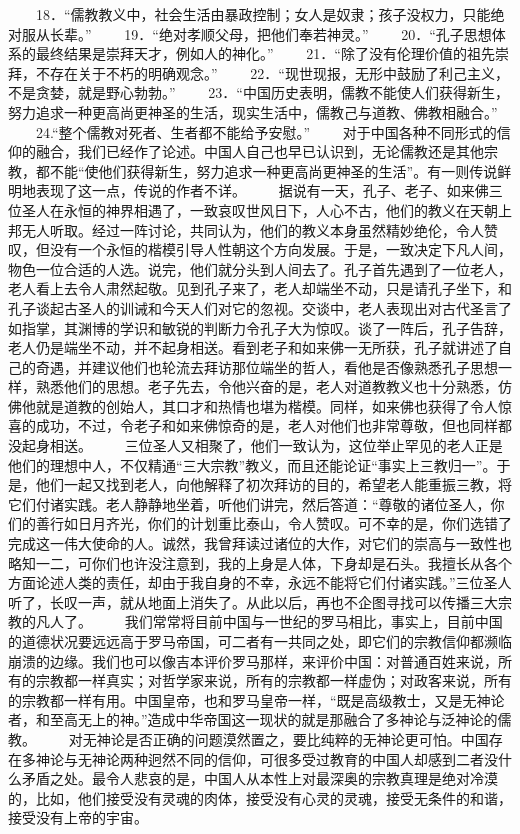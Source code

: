 \documentclass[12pt,oneside]{book}
\begin{document}
\begin{common-format}
　　18．“儒教教义中，社会生活由暴政控制；女人是奴隶；孩子没权力，只能绝对服从长辈。” 
　　19．“绝对孝顺父母，把他们奉若神灵。” 
　　20．“孔子思想体系的最终结果是崇拜天才，例如人的神化。” 
　　21．“除了没有伦理价值的祖先崇拜，不存在关于不朽的明确观念。” 
　　22．“现世现报，无形中鼓励了利己主义，不是贪婪，就是野心勃勃。” 
　　23．“中国历史表明，儒教不能使人们获得新生，努力追求一种更高尚更神圣的生活，现实生活中，儒教己与道教、佛教相融合。” 
　　24.“整个儒教对死者、生者都不能给予安慰。” 
　　对于中国各种不同形式的信仰的融合，我们已经作了论述。中国人自己也早已认识到，无论儒教还是其他宗教，都不能“使他们获得新生，努力追求一种更高尚更神圣的生活”。有一则传说鲜明地表现了这一点，传说的作者不详。 
　　据说有一天，孔子、老子、如来佛三位圣人在永恒的神界相遇了，一致哀叹世风日下，人心不古，他们的教义在天朝上邦无人听取。经过一阵讨论，共同认为，他们的教义本身虽然精妙绝伦，令人赞叹，但没有一个永恒的楷模引导人性朝这个方向发展。于是，一致决定下凡人间，物色一位合适的人选。说完，他们就分头到人间去了。孔子首先遇到了一位老人，老人看上去令人肃然起敬。见到孔子来了，老人却端坐不动，只是请孔子坐下，和孔子谈起古圣人的训诫和今天人们对它的忽视。交谈中，老人表现出对古代圣言了如指掌，其渊博的学识和敏锐的判断力令孔子大为惊叹。谈了一阵后，孔子告辞，老人仍是端坐不动，并不起身相送。看到老子和如来佛一无所获，孔子就讲述了自己的奇遇，并建议他们也轮流去拜访那位端坐的哲人，看他是否像熟悉孔子思想一样，熟悉他们的思想。老子先去，令他兴奋的是，老人对道教教义也十分熟悉，仿佛他就是道教的创始人，其口才和热情也堪为楷模。同样，如来佛也获得了令人惊喜的成功，不过，令老子和如来佛惊奇的是，老人对他们也非常尊敬，但也同样都没起身相送。 
　　三位圣人又相聚了，他们一致认为，这位举止罕见的老人正是他们的理想中人，不仅精通“三大宗教”教义，而且还能论证“事实上三教归一”。于是，他们一起又找到老人，向他解释了初次拜访的目的，希望老人能重振三教，将它们付诸实践。老人静静地坐着，听他们讲完，然后答道：“尊敬的诸位圣人，你们的善行如日月齐光，你们的计划重比泰山，令人赞叹。可不幸的是，你们选错了完成这一伟大使命的人。诚然，我曾拜读过诸位的大作，对它们的崇高与一致性也略知一二，可你们也许没注意到，我的上身是人体，下身却是石头。我擅长从各个方面论述人类的责任，却由于我自身的不幸，永远不能将它们付诸实践。”三位圣人听了，长叹一声，就从地面上消失了。从此以后，再也不企图寻找可以传播三大宗教的凡人了。 
　　我们常常将目前中国与一世纪的罗马相比，事实上，目前中国的道德状况要远远高于罗马帝国，可二者有一共同之处，即它们的宗教信仰都濒临崩溃的边缘。我们也可以像吉本评价罗马那样，来评价中国：对普通百姓来说，所有的宗教都一样真实；对哲学家来说，所有的宗教都一样虚伪；对政客来说，所有的宗教都一样有用。中国皇帝，也和罗马皇帝一样，“既是高级教士，又是无神论者，和至高无上的神。”造成中华帝国这一现状的就是那融合了多神论与泛神论的儒教。 
　　对无神论是否正确的问题漠然置之，要比纯粹的无神论更可怕。中国存在多神论与无神论两种迥然不同的信仰，可很多受过教育的中国人却感到二者没什么矛盾之处。最令人悲哀的是，中国人从本性上对最深奥的宗教真理是绝对冷漠的，比如，他们接受没有灵魂的肉体，接受没有心灵的灵魂，接受无条件的和谐，接受没有上帝的宇宙。 


\end{common-format}
\end{document}
